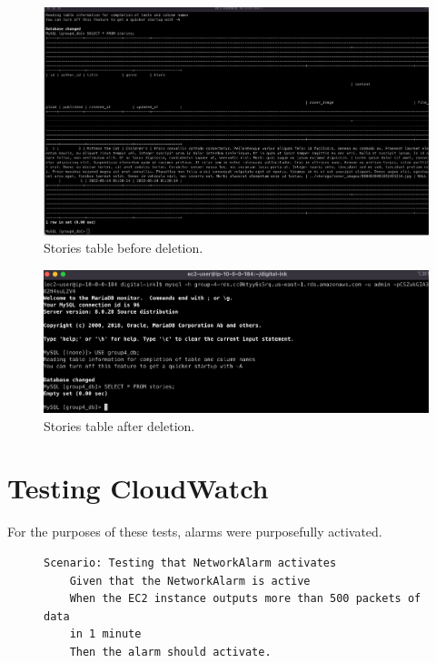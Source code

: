 \begin{figure}[!htbp]
    \centering
    \includegraphics[width=\textwidth]{resources/rds/rds-testing-stories-after}
    \caption{Stories table before deletion.}
    \label{fig:rds-testing-before-story-deletion}
\end{figure}

\begin{figure}[!htbp]
    \centering
    \includegraphics[width=\textwidth]{resources/rds/rds-testing-stories-before}
    \caption{Stories table after deletion.}
    \label{fig:rds-testing-after-story-deletion}
\end{figure}

\clearpage
\section{Testing CloudWatch}\label{sec:testing-cloudwatch}
For the purposes of these tests, alarms were purposefully activated.

\begin{figure}[!htbp]
    \centering
    \begin{verbatim}
Scenario: Testing that NetworkAlarm activates
    Given that the NetworkAlarm is active
    When the EC2 instance outputs more than 500 packets of data
    in 1 minute
    Then the alarm should activate.
    \end{verbatim}
    \label{fig:cloudwatch-network-alarm-test}
\end{figure}

